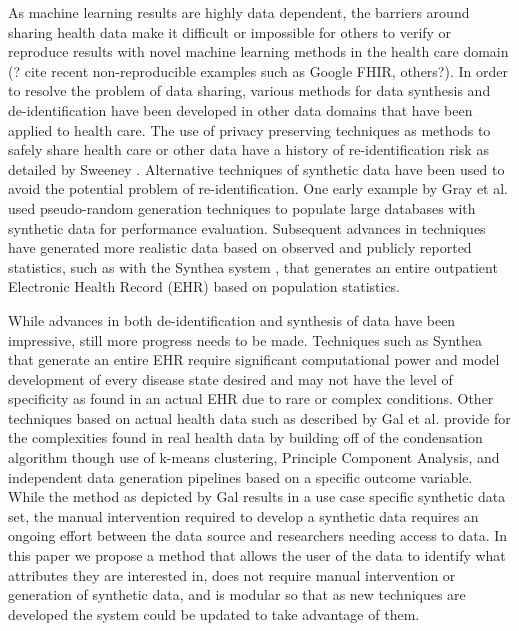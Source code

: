  As machine learning results are highly data dependent, the barriers around sharing health data make it difficult or impossible for others to verify or reproduce results with novel machine learning methods in the health care domain (? cite recent non-reproducible examples such as Google FHIR, others?). In order to resolve the problem of data sharing, various methods for data synthesis and de-identification have been developed in other data domains that have been applied to health care. The use of privacy preserving techniques as methods to safely share health care or other data have a history of re-identification risk as detailed by Sweeney \cite{sweeney_2002}. Alternative techniques of synthetic data have been used to avoid the potential problem of re-identification. One early example by Gray et al. \cite{gray_quickly_1994} used pseudo-random generation techniques to populate large databases with synthetic data for performance evaluation. Subsequent advances in techniques have generated more realistic data based on observed and publicly reported statistics, such as with the Synthea system \cite{walonoski_synthea:_2018}, that generates an entire outpatient Electronic Health Record (EHR) based on population statistics. 
 
 While advances in both de-identification and synthesis of data have been impressive, still more progress needs to be made. Techniques such as Synthea that generate an entire EHR require significant computational power and model development of every disease state desired and may not have the level of specificity as found in an actual EHR due to rare or complex conditions. Other techniques based on actual health data such as described by Gal et al. \cite{gal_data_2014} provide for the complexities found in real health data by building off of the condensation algorithm \cite{aggarwal_static_2008} though use of k-means clustering, Principle Component Analysis, and independent data generation pipelines based on a specific outcome variable. While the method as depicted by Gal results in a use case specific synthetic data set, the manual intervention required to develop a synthetic data requires an ongoing effort between the data source and researchers needing access to data. In this paper we propose a method that allows the user of the data to identify what attributes they are interested in, does not require manual intervention or generation of synthetic data, and is modular so that as new techniques are developed the system could be updated to take advantage of them.
 